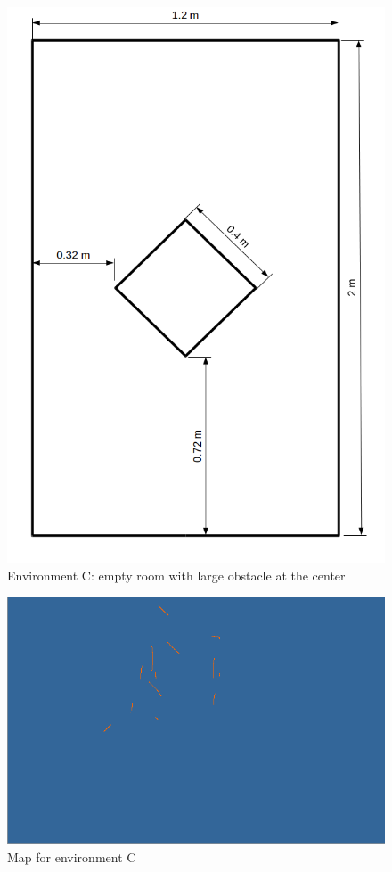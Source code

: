 \begin{figure}[h]
\centering
\includegraphics[scale=0.4]{Chapter4/images/experiment_3.png}
\caption{Environment C: empty room with large obstacle at the center}
\label{fig:experiment_c}
\end{figure}

\begin{figure}[h]
\centering
\includegraphics[scale=0.4]{Chapter4/images/experiment_3_map.png}
\caption{Map for environment C}
\label{fig:experiment_c_map}
\end{figure}